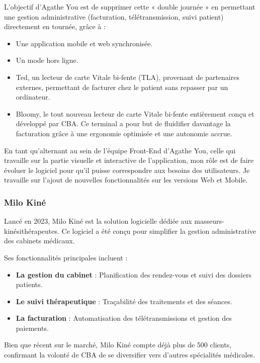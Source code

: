 \documentclass{article}
\begin{document}
L'objectif d'Agathe You est de supprimer cette « double journée » en permettant une gestion administrative (facturation, télétransmission, suivi patient) directement en tournée, grâce à :

\begin{itemize}
    \item Une application mobile et web synchronisée.
    \item Un mode hors ligne.
    \item Ted, un lecteur de carte Vitale bi-fente (TLA), provenant de partenaires externes, permettant de facturer chez le patient sans repasser par un ordinateur.
    \item Bloomy, le tout nouveau lecteur de carte Vitale bi-fente entièrement conçu et développé par CBA. Ce terminal a pour but de fluidifier davantage la facturation grâce à une ergonomie optimisée et une autonomie accrue.
\end{itemize}

En tant qu'alternant au sein de l'équipe Front-End d'Agathe You, celle qui travaille sur la partie visuelle et interactive de l'application, mon rôle est de faire évoluer le logiciel pour qu'il puisse correspondre aux besoins des utilisateurs. Je travaille sur l'ajout de nouvelles fonctionnalités sur les versions Web et Mobile.

\subsubsection{Milo Kiné}

Lancé en 2023, Milo Kiné est la solution logicielle dédiée aux masseurs-kinésithérapeutes. Ce logiciel a été conçu pour simplifier la gestion administrative des cabinets médicaux.

Ses fonctionnalités principales incluent :

\begin{itemize}
    \item \textbf{La gestion du cabinet} : Planification des rendez-vous et suivi des dossiers patients.
    \item \textbf{Le suivi thérapeutique} : Traçabilité des traitements et des séances.
    \item \textbf{La facturation} : Automatisation des télétransmissions et gestion des paiements.
\end{itemize}

Bien que récent sur le marché, Milo Kiné compte déjà plus de 500 clients, confirmant la volonté de CBA de se diversifier vers d'autres spécialités médicales.
\end{document}
